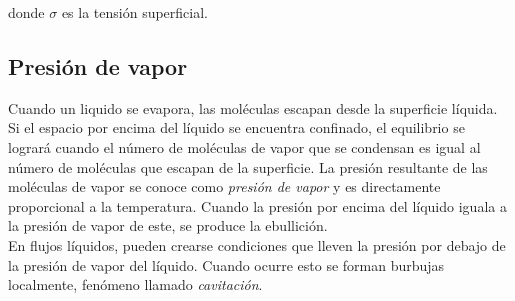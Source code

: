 donde $\sigma$ es la tensión superficial.

\subsection{Presión de vapor}
Cuando un liquido se evapora, las moléculas escapan desde la superficie líquida.  Si el espacio por encima del líquido se encuentra confinado, el equilibrio se logrará cuando el número de moléculas de vapor que se condensan es igual al número de moléculas que escapan de la superficie. La presión resultante de las moléculas de vapor se conoce como \emph{presión de vapor} y es directamente proporcional a la temperatura. Cuando la presión por encima del líquido iguala a la presión de vapor de este, se produce la ebullición. \\

En flujos líquidos, pueden crearse condiciones que lleven la presión por debajo de la presión de vapor del líquido. Cuando ocurre esto se forman burbujas localmente, fenómeno llamado \emph{cavitación}.



